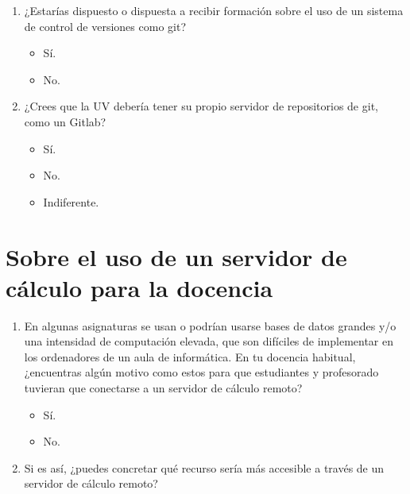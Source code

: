 \documentclass[a4paper,12pt]{article}
\newcounter{preg}[section]
\begin{document}
\begin{enumerate}
\item {} ¿Estarías dispuesto o dispuesta a recibir formación sobre el uso de un sistema de control de
      versiones como \textsf{git}?
   \begin{itemize}
   \item Sí.
   \item No.
   \end{itemize}

\item {} ¿Crees que la UV debería tener su propio servidor de repositorios de \textsf{git}, como un
      Gitlab? \cite{Paderborn2023,PereiraBraga2023}
   \begin{itemize}
   \item Sí.
   \item No.
   \item Indiferente.
   \end{itemize}
\end{enumerate}

\section{Sobre el uso de un servidor de cálculo para la docencia}
\begin{enumerate}
\item {} En algunas asignaturas se usan o podrían usarse bases de datos grandes y/o una intensidad de
      computación elevada, que son difíciles de implementar en los ordenadores de un aula de
      informática. En tu docencia habitual, ¿encuentras algún motivo como estos para que estudiantes
      y profesorado tuvieran que conectarse a un servidor de cálculo remoto?
   \begin{itemize}
   \item Sí.
   \item No.
   \end{itemize}

\item {} Si es así, ¿puedes concretar qué recurso sería más accesible a través de un servidor de 
      cálculo remoto?
\vspace*{1cm}
\end{enumerate}



\end{document}
